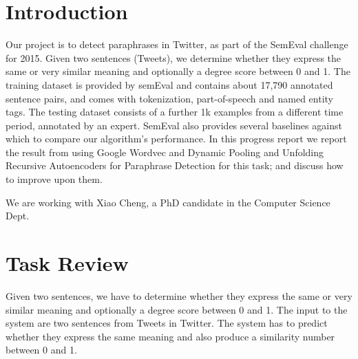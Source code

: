 \documentclass[conference]{IEEEtran}
\begin{document}



%
\IEEEpeerreviewmaketitle



\section{Introduction}
Our project is to detect paraphrases in Twitter, as part of the SemEval challenge for 2015.   Given two sentences (Tweets), we determine whether they express the same or very similar meaning and optionally a degree score between 0 and 1.  The training dataset is provided by semEval and contains about 17,790 annotated sentence pairs, and comes with tokenization, part-of-speech and named entity tags.  The testing dataset consists of a further 1k examples from a different time period, annotated by an expert.  SemEval also provides several baselines against which to compare our algorithm's performance.  In this progress report we report the result from using Google Wordvec and Dynamic Pooling and Unfolding Recursive Autoencoders for Paraphrase Detection for this task; and discuss how to improve upon them.


We are working with  Xiao Cheng, a PhD candidate in the Computer Science Dept.


\section{Task Review}
Given two sentences, we have to determine whether they express the same or very similar meaning and optionally a degree score between 0 and 1. The input to the system are two sentences from Tweets in Twitter. The system has to predict whether they express the same meaning and also produce a similarity number between 0 and 1.\\
\end{document}
